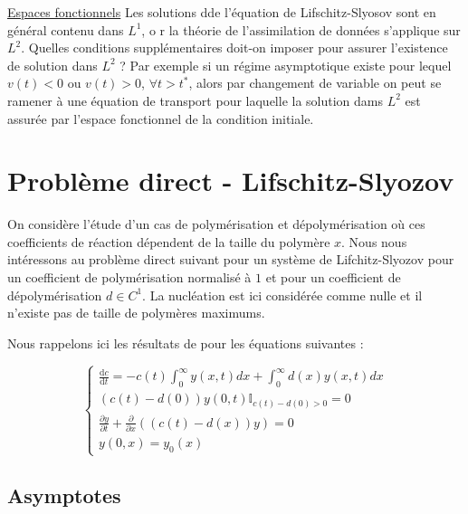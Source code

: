 \documentclass[a4paper]{article}
\theoremstyle{definition}
\theoremstyle{remark}
\newcommand{\dep}{d}
\begin{document}
\underline{Espaces fonctionnels} Les solutions dde l'équation de Lifschitz-Slyosov sont en général contenu dans $L^1$, o
r la théorie de l'assimilation de données s'applique sur $L^2$. 
Quelles conditions supplémentaires doit-on imposer pour assurer l'existence de solution dans $L^2$ ? 
Par exemple si un régime asymptotique existe pour lequel $v(t)<0$ ou $v(t)>0$, $\forall t > t^*$, 
alors par changement de variable on peut se ramener à une équation de transport 
pour laquelle la solution dams $L^2$ est assurée par l'espace fonctionnel de la condition initiale.



\section{Problème direct - Lifschitz-Slyozov}


On considère l'étude d'un cas de polymérisation et dépolymérisation où ces coefficients de réaction dépendent de la taille du polymère $x$.
Nous nous intéressons au problème direct suivant pour un système de Lifchitz-Slyozov pour un coefficient de polymérisation normalisé à $1$ et pour un coefficient de dépolymérisation $\dep \in C^1$. La nucléation est ici considérée comme nulle et il n'existe pas de taille de polymères maximums.

Nous rappelons ici les résultats de \cite{CalvoPerthame} pour les équations suivantes :

\begin{equation}
	\label{eq:lsc}
\begin{cases}
	\displaystyle \frac{\mathrm{d}c}{\mathrm{d}t} = -c(t) \int_0^\infty y(x,t)dx + \int_0^\infty \dep(x) y(x,t)dx \\
	(c(t)-d(0))y(0,t)\mathbb{I}_{c(t)-\dep(0) > 0} = 0 \\
	\displaystyle \frac{\partial y}{\partial t}+ \frac{\partial}{\partial x}((c(t)-\dep(x))y) = 0 \\
	y(0,x) = y_0(x)
\end{cases}
\end{equation}





\subsection{Asymptotes}
\end{document}
